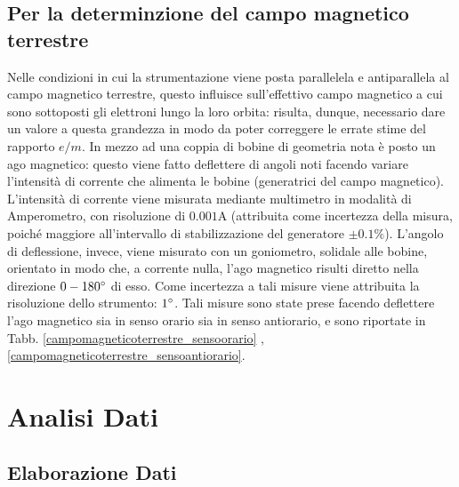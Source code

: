 \documentclass[]{article}
\let\oldsection\section%
\renewcommand{\section}{%
	\renewcommand{\theequation}{\thesection.\arabic{equation}}%
	\oldsection}%
\let\oldsubsection\subsection%
\renewcommand{\subsection}{%
	\renewcommand{\theequation}{\thesubsection.\arabic{equation}}%
	\oldsubsection}%
\begin{document}
    \subsection{Per la determinzione del campo magnetico terrestre}
    Nelle condizioni in cui la strumentazione viene posta parallelela e antiparallela al campo magnetico terrestre, questo influisce sull'effettivo campo magnetico a cui sono sottoposti gli elettroni lungo la loro orbita: risulta, dunque, necessario dare un valore a questa grandezza in modo da poter correggere le errate stime del rapporto $e/m$. In mezzo ad una coppia di bobine di geometria nota è posto un ago magnetico: questo viene fatto deflettere di angoli noti facendo variare l'intensità di corrente che alimenta le bobine (generatrici del campo magnetico). L'intensità di corrente viene misurata mediante multimetro in modalità di Amperometro, con risoluzione di $0.001 \text{A}$ (attribuita come incertezza della misura, poiché maggiore all'intervallo di stabilizzazione del generatore $\pm 0.1 \%$). L'angolo di deflessione, invece, viene misurato con un goniometro, solidale alle bobine, orientato in modo che, a corrente nulla, l'ago magnetico risulti diretto nella direzione $0-180 \degree $ di esso. Come incertezza a tali misure viene attribuita la risoluzione dello strumento: $1 \degree$. Tali misure sono state prese facendo deflettere l'ago magnetico sia in senso orario sia in senso antiorario, e sono riportate in Tabb. \ref{campomagneticoterrestre_sensoorario} , \ref{campomagneticoterrestre_sensoantiorario}.
    

    \section {Analisi Dati}

    \subsection{Elaborazione Dati}
\end{document}
